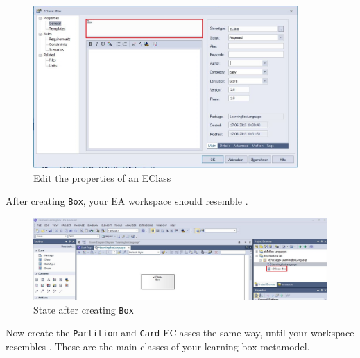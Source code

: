 \begin{stepbystep}
\clearpage

\begin{figure}[ht]
	\centering
  \includegraphics[width=0.9\textwidth]{../../org.moflon.doc.handbook.02_leitnersLearningBox/2_staticSemantics/2_definingClasses/dcVisImages/ea_propertiesEClass}
	\caption{Edit the properties of an EClass}
	\label{ea:eclass_properties}
\end{figure}

\item After creating \texttt{Box}, your EA workspace should resemble .

\vspace{0.5cm}

\begin{figure}[htbp]
	\centering
  \includegraphics[width=1\textwidth]{../../org.moflon.doc.handbook.02_leitnersLearningBox/2_staticSemantics/2_definingClasses/dcVisImages/ea_afterBoxCreation}
	\caption{State after creating \texttt{Box}}
	\label{ea:eclass_completed}
\end{figure}

\item Now create the \texttt{Partition} and \texttt{Card} EClasses the same way, until your workspace resembles
. These are the main classes of your learning box metamodel.

\vspace{0.5cm}


\end{stepbystep}
